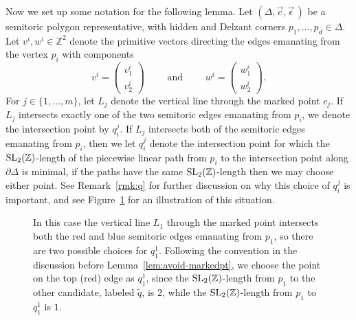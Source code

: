 \documentclass[pdftex]{sigma}
\numberwithin{equation}{section}
\def\Z{{\mathbb Z}}
\newcommand{\De}{\Delta}
\newcommand{\SL}{{\rm SL}_2(\Z)}
\newcommand{\strep}{(\De,\vec{c},\vec{\epsilon}\,)}
\newcommand{\vectbig}[2]{\begin{pmatrix} #1 \\ #2 \end{pmatrix}}
\begin{document}
 Now we set up some notation for the following lemma.
 Let $\strep$ be a semitoric polygon representative, with hidden and Delzant corners $p_1,\ldots,p_d\in\De$.
 Let $v^i,w^i\in\Z^2$ denote the primitive vectors directing the edges emanating from the vertex $p_i$ with components
 \[v^i = \vectbig{v^i_1}{v^i_2}\qquad \text{ and }\qquad w^i = \vectbig{w^i_1}{w^i_2}.\]
 For $j\in\{1,\ldots, m\}$,
 let $L_j$ denote the vertical line through the marked point $c_j$.
 If $L_j$ intersects exactly one of the two semitoric edges emanating from $p_i$, we denote the intersection point by $q_i^j$.
 If $L_j$ intersects both of the semitoric edges emanating from $p_i$, then we let $q_i^j$ denote the intersection point for which the $\SL$-length of the piecewise linear path from $p_i$ to the intersection point along $\partial\De$ is minimal,
 if the paths have the same $\SL$-length then we may choose either point.
 See Remark~\ref{rmk:q} for further discussion on why this choice of $q_i^j$ is important, and see Figure~\ref{fig:q-choice} for an illustration of this situation.

 \begin{figure}[t]
 \centering
 \caption{In this case the vertical line $L_1$ through the marked point intersects both the red and blue semitoric edges emanating from $p_1$, so there are two possible choices for $q_1^1$. Following the convention in the discussion before Lemma~\ref{lem:avoid-markedpt}, we choose the point on the top (red) edge as $q_1^1$, since the $\SL$-length from $p_1$ to the other candidate, labeled $\tilde{q}$, is $2$, while the $\SL$-length from $p_1$ to $q_1^1$ is $1$.}
 \label{fig:q-choice}
 \end{figure}
\end{document}
